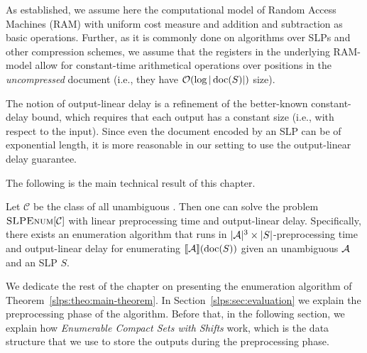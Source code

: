 As established, we assume here the computational model of Random Access Machines (RAM) with uniform cost measure and addition and subtraction as basic operations. 
Further, as it is commonly done on algorithms over SLPs and other compression schemes, we assume that the registers in the underlying RAM-model allow for constant-time arithmetical operations over positions in the {\it uncompressed} document (i.e., they have $\mathcal{O}(\log |\operatorname{doc}(S)|)$ size).

The notion of output-linear delay is a refinement of the better-known constant-delay bound, which requires that each output has a constant size (i.e., with respect to the input). Since even the document encoded by an SLP can be of exponential length, it is more reasonable in our setting to use the output-linear delay guarantee. 


The following is the main technical result of this chapter.

\begin{theorem}\label{slps:theo:main-theorem}
	Let $\mathcal{C}$ be the class of all unambiguous \rts. Then one can solve the problem $\textsc{SLPEnum}[\mathcal{C}]$ with linear preprocessing time and output-linear delay. Specifically, there exists an enumeration algorithm that runs in $|\mathcal{A}|^3 \times |S|$-preprocessing time and output-linear delay for enumerating $\llbracket \mathcal{A} \rrbracket(\operatorname{doc}(S))$ given an unambiguous \rt $\mathcal{A}$ and an SLP $S$. 
\end{theorem}

We dedicate the rest of the chapter on presenting the enumeration algorithm of Theorem~\ref{slps:theo:main-theorem}. In Section~\ref{slps:sec:evaluation} we explain the preprocessing phase of the algorithm. Before that, in the following section, we explain how \emph{Enumerable Compact Sets with Shifts} work, which is the data structure that we use to store the outputs during the preprocessing phase. 


%
%



